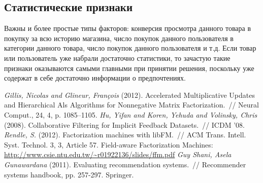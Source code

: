 \documentclass[12pt,fleqn]{article}
\begin{document}
\subsection{Статистические признаки}
Важны и более простые типы факторов: конверсия просмотра данного товара в покупку за всю историю магазина,
число покупок данного пользователя в категории данного товара, число покупок данного пользователя и т.д.
Если товар или пользователь уже набрали достаточно статистики, то зачастую такие признаки
оказываются самыми главными при принятии решения, поскольку уже содержат в себе достаточно информации
о предпочтениях.


\begin{thebibliography}{1}
    \emph{Gillis, Nicolas and Glineur, Fran\c{c}ois} (2012).
    Accelerated Multiplicative Updates and Hierarchical Als Algorithms for Nonnegative Matrix Factorization.~//
    Neural Comput., 24, 4, p. 1085--1105.
    \emph{Hu, Yifan and Koren, Yehuda and Volinsky, Chris} (2008).
    Collaborative Filtering for Implicit Feedback Datasets.~//
    ICDM '08.
    \emph{Rendle, S.} (2012).
    Factorization machines with libFM.~//
    ACM Trans. Intell. Syst. Technol. 3, 3, Article 57.
    Field-aware Factorization Machines: \\\url{http://www.csie.ntu.edu.tw/\~r01922136/slides/ffm.pdf}
    \emph{Guy Shani, Asela Gunawardana} (2011).
    Evaluating recommendation systems.~//
    Recommender systems handbook, pp. 257-297. Springer.
\end{thebibliography}
\end{document}
